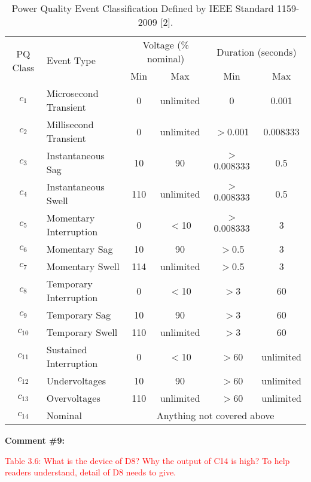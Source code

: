 \documentclass[journal]{IEEEtran}
\begin{document}
\begin{table}[!h]
\center \color{blue}
\caption{Power Quality Event Classification Defined by IEEE Standard 1159-2009 [2].}
\begin{tabular}{|c|l|c|c|c|c|}
\hline \multirow{2}{*}{PQ Class} & \multirow{2}{*}{Event Type} & \multicolumn{2}{|c|}{Voltage (\% nominal)} & \multicolumn{2}{|c|}{Duration (seconds)} \\
\cline{3-6}   &  & Min & Max & Min & Max \\ 
\hline  $c_1$ & Microsecond Transient  & 0   & unlimited & 0           & 0.001    \\
\hline  $c_2$ & Millisecond Transient  & 0   & unlimited & $>$0.001    & 0.008333 \\
\hline  $c_3$ & Instantaneous Sag      & 10  & 90        & $>$0.008333 & 0.5      \\
\hline  $c_4$ & Instantaneous Swell    & 110 & unlimited & $>$0.008333 & 0.5      \\
\hline  $c_5$ & Momentary Interruption & 0   & $<$10     & $>$0.008333 & 3        \\
\hline  $c_6$ & Momentary Sag          & 10  & 90        & $>$0.5      & 3        \\
\hline  $c_7$ & Momentary Swell        & 114 & unlimited & $>$0.5      & 3        \\
\hline  $c_8$ & Temporary Interruption & 0   & $<$10     & $>$3        & 60       \\
\hline  $c_9$ & Temporary Sag          & 10  & 90        & $>$3        & 60       \\
\hline $c_{10}$ & Temporary Swell        & 110 & unlimited & $>$3        & 60       \\
\hline $c_{11}$ & Sustained Interruption & 0   & $<$10     & $>$60       & unlimited\\
\hline $c_{12}$ & Undervoltages          & 10  & 90        & $>$60       & unlimited\\
\hline $c_{13}$ & Overvoltages           & 110 & unlimited & $>$60       & unlimited\\
\hline $c_{14}$ & Nominal                & \multicolumn{4}{|c|}{Anything not covered above} \\ \hline
\end{tabular}
\end{table}


\vspace{30pt}
\textbf{Comment \#9:}
\begin{adjustwidth}{2.5em}{0pt}
\singlespacing \vspace{-10pt}
\textcolor{red}{Table 3.6: What is the device of D8? Why the output of C14 is high?  To help readers understand, detail of D8 needs to give.}
\end{adjustwidth}
\end{document}
